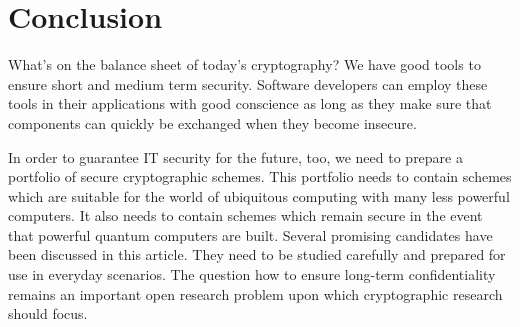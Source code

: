 \section{Conclusion}
\label{sec:conclusion}

What's on the balance sheet of today's cryptography?  We
have good tools to ensure short and medium term
security.  Software developers can employ these
tools in their applications with good conscience
as long as they make sure that components
can quickly be exchanged when they become
insecure.

In order to guarantee IT security for the future, too,
we need to prepare a portfolio of secure cryptographic
schemes.  This portfolio needs to contain schemes
which are suitable for the world of ubiquitous
computing with many less powerful computers.  It
also needs to contain schemes which remain secure
in the event that powerful quantum computers are
built.  Several promising candidates have been
discussed in this article.  They need to be
studied carefully and prepared for use in everyday
scenarios.  The question how to ensure long-term
confidentiality remains an important open research
problem upon which cryptographic research should
focus.

\putbib
{}   %

